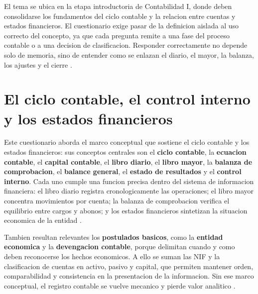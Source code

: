 \documentclass[
	spanish,
	letterpaper, oneside
]{article}
\begin{document}
El tema se ubica en la etapa introductoria de Contabilidad I, donde deben consolidarse los fundamentos del ciclo contable y la relacion entre cuentas y estados financieros. El cuestionario exige pasar de la definicion aislada al uso correcto del concepto, ya que cada pregunta remite a una fase del proceso contable o a una decision de clasificacion. Responder correctamente no depende solo de memoria, sino de entender como se enlazan el diario, el mayor, la balanza, los ajustes y el cierre \citep{openstaxFinancialAccounting2019,kiesoIntermediateAccounting2020}.

\section{El ciclo contable, el control interno y los estados financieros}

Este cuestionario aborda el marco conceptual que sostiene el ciclo contable y los estados financieros: sus conceptos centrales son el \textbf{ciclo contable}, la \textbf{ecuacion contable}, el \textbf{capital contable}, el \textbf{libro diario}, el \textbf{libro mayor}, la \textbf{balanza de comprobacion}, el \textbf{balance general}, el \textbf{estado de resultados} y el \textbf{control interno}. Cada uno cumple una funcion precisa dentro del sistema de informacion financiera: el libro diario registra cronologicamente las operaciones; el libro mayor concentra movimientos por cuenta; la balanza de comprobacion verifica el equilibrio entre cargos y abonos; y los estados financieros sintetizan la situacion economica de la entidad \citep{openstaxFinancialAccounting2019,kiesoIntermediateAccounting2020}.

Tambien resultan relevantes los \textbf{postulados basicos}, como la \textbf{entidad economica} y la \textbf{devengacion contable}, porque delimitan cuando y como deben reconocerse los hechos economicos. A ello se suman las NIF y la clasificacion de cuentas en activo, pasivo y capital, que permiten mantener orden, comparabilidad y consistencia en la presentacion de la informacion. Sin ese marco conceptual, el registro contable se vuelve mecanico y pierde valor analitico \citep{cinifNif2025,imcpNif2024}.

\end{document}
